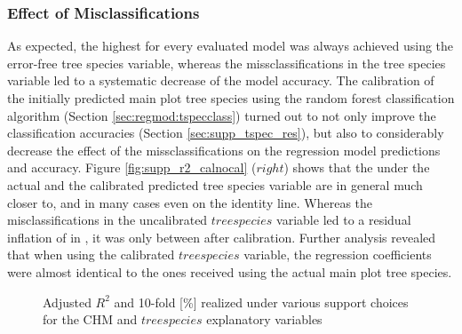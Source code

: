 \subsubsection*{Effect of Misclassifications}

 As expected, the highest \adjrsq{} for every evaluated model was always achieved using the error-free tree species variable, whereas the missclassifications in the tree species variable led to a systematic decrease of the model accuracy. The calibration of the initially predicted main plot tree species using the random forest classification algorithm (Section \ref{sec:regmod:tspecclass}) turned out to not only improve the classification accuracies (Section \ref{sec:supp_tspec_res}), but also to considerably decrease the effect of the missclassifications on the regression model predictions and accuracy. Figure \ref{fig:supp_r2_calnocal} ($right$) shows that the \adjrsq{} under the actual and the calibrated predicted tree species variable are in general much closer to, and in many cases even on the identity line.  Whereas the misclassifications in the uncalibrated $treespecies$ variable led to a residual inflation of  in \adjrsq{}, it was only between  after calibration. Further analysis revealed that when using the calibrated $treespecies$ variable, the regression coefficients were almost identical to the ones received using the actual main plot tree species.

\begin{figure}[h]
	\centering
	\caption{Adjusted $R^2$ and 10-fold \rmsecv{}[\%] realized under various support choices for the CHM and $tree species$ explanatory variables}
	\label{fig:supp_perf_res}
\end{figure}


